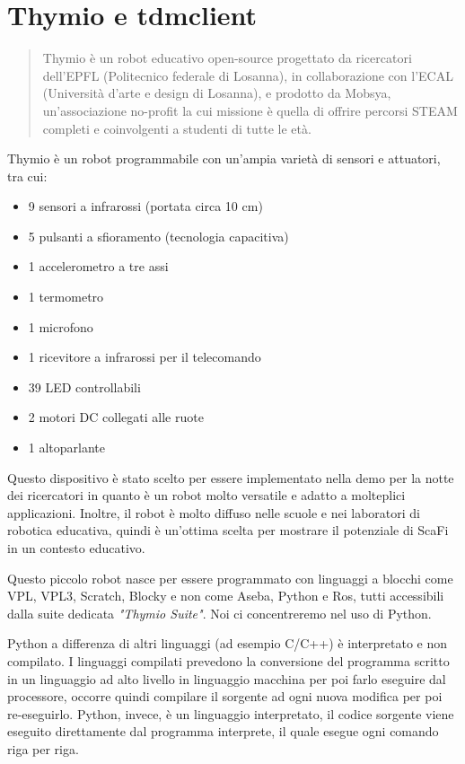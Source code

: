 \documentclass[12pt,a4paper,openright,twoside]{book}
\begin{document}
\section{Thymio e tdmclient}

\begin{quote}
    Thymio è un robot educativo open-source progettato da ricercatori dell'EPFL (Politecnico federale di Losanna), in collaborazione con l'ECAL (Università d'arte e design di Losanna), e prodotto da Mobsya, un'associazione no-profit la cui missione è quella di offrire percorsi STEAM completi e coinvolgenti a studenti di tutte le età.
\end{quote}

Thymio è un robot programmabile con un'ampia varietà di sensori e attuatori, tra cui:
\begin{itemize}
    \item 9 sensori a infrarossi (portata circa 10 cm)
    \item 5 pulsanti a sfioramento (tecnologia capacitiva)
    \item 1 accelerometro a tre assi
    \item 1 termometro
    \item 1 microfono
    \item 1 ricevitore a infrarossi per il telecomando
    \item 39 LED controllabili
    \item 2 motori DC collegati alle ruote
    \item 1 altoparlante
\end{itemize}


Questo dispositivo è stato scelto per essere implementato nella demo per la notte dei ricercatori in quanto è un robot molto versatile e adatto a molteplici applicazioni. Inoltre, il robot è molto diffuso nelle scuole e nei laboratori di robotica educativa, quindi è un'ottima scelta per mostrare il potenziale di ScaFi in un contesto educativo.

Questo piccolo robot nasce per essere programmato con linguaggi a blocchi come VPL, VPL3, Scratch, Blocky e non come Aseba, Python e Ros, tutti accessibili dalla suite dedicata \textit{"Thymio Suite"}.
Noi ci concentreremo nel uso di Python. 

Python a differenza di altri linguaggi (ad esempio C/C++) è interpretato e non compilato. I linguaggi compilati prevedono la conversione del programma scritto in un linguaggio ad alto livello in linguaggio macchina per poi farlo eseguire dal processore, occorre quindi compilare il sorgente ad ogni nuova modifica per poi re-eseguirlo. Python, invece, è un linguaggio interpretato, il codice sorgente viene eseguito direttamente dal programma interprete, il quale esegue ogni comando riga per riga.
\end{document}
